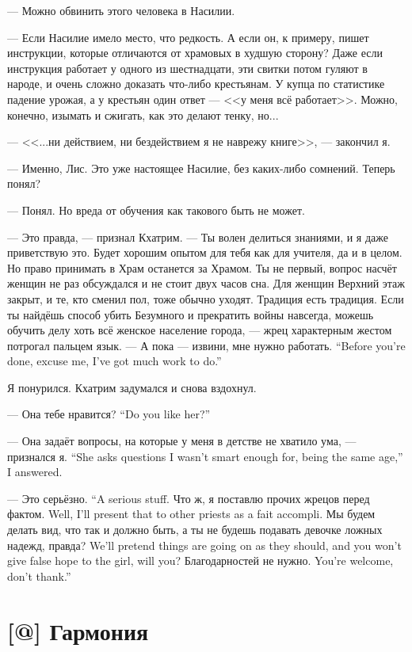 --- Можно обвинить этого человека в Насилии.

--- Если Насилие имело место, что редкость.
А если он, к примеру, пишет инструкции, которые отличаются от храмовых в худшую сторону?
Даже если инструкция работает у одного из шестнадцати, эти свитки потом гуляют в народе, и очень сложно доказать что-либо крестьянам.
У купца по статистике падение урожая, а у крестьян один ответ --- <<у меня всё работает>>.
Можно, конечно, изымать и сжигать, как это делают тенку, но...

--- <<...ни действием, ни бездействием я не наврежу книге>>, --- закончил я.

--- Именно, Лис.
Это уже настоящее Насилие, без каких-либо сомнений.
Теперь понял?

--- Понял.
Но вреда от обучения как такового быть не может.

--- Это правда, --- признал Кхатрим.
--- Ты волен делиться знаниями, и я даже приветствую это.
Будет хорошим опытом для тебя как для учителя, да и в целом.
Но право принимать в Храм останется за Храмом.
Ты не первый, вопрос насчёт женщин не раз обсуждался и не стоит двух часов сна.
Для женщин Верхний этаж закрыт, и те, кто сменил пол, тоже обычно уходят.
Традиция есть традиция.
Если ты найдёшь способ убить Безумного и прекратить войны навсегда, можешь обучить делу хоть всё женское население города, --- жрец характерным жестом потрогал пальцем язык.
{--- А пока --- извини, мне нужно работать.}
{``Before you're done, excuse me, I've got much work to do.''}

Я понурился.
Кхатрим задумался и снова вздохнул.

{--- Она тебе нравится?}
{``Do you like her?''}

{--- Она задаёт вопросы, на которые у меня в детстве не хватило ума, --- признался я.}
{``She asks questions I wasn't smart enough for, being the same age,'' I answered.}

{--- Это серьёзно.}
{``A serious stuff.}
{Что ж, я поставлю прочих жрецов перед фактом.}
{Well, I'll present that to other priests as a fait accompli.}
{Мы будем делать вид, что так и должно быть, а ты не будешь подавать девочке ложных надежд, правда?}
{We'll pretend things are going on as they should, and you won't give false hope to the girl, will you?}
{Благодарностей не нужно.}
{You're welcome, don't thank.''}

\section{[@] Гармония}

